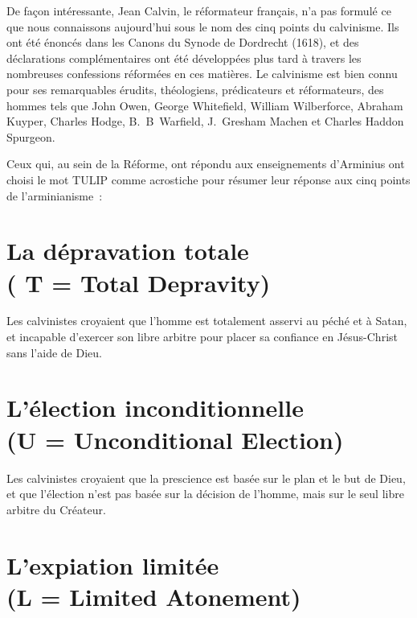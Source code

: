 
\digestpagebreak
\begin{pocketpar}{}
\begin{digestpar}{}
De façon intéressante, Jean Calvin, le réformateur français, n'a pas formulé
 ce que nous con\-naissons au\-jour\-d'hui sous le nom des cinq points du calvinisme.
 Ils ont été énoncés dans les Canons du Synode de Dordrecht (1618), et des déclarations
 complémentaires ont été développées plus tard à travers les nombreuses
 confessions réformées en ces matières. Le calvinisme est bien connu
 pour 
 ses remarquables érudits, théologiens, prédicateurs et réformateurs,
 des hommes tels que John Owen, George Whitefield,
 William Wilberforce, Abraham Kuyper, Charles Hodge,
 B.~B~Warfield, J.~Gresham Machen et
 Charles Haddon Spurgeon.
\end{digestpar}
\end{pocketpar}

Ceux qui, au sein de la Réforme, ont répondu aux enseignements d'Arminius
 ont choisi le mot \og \mbox{TULIP} \fg{} comme acrostiche pour résumer
 leur réponse aux cinq points de l'arminianisme~:


\newcommand*{\sectitle}[1]{%
   \normalsize(#1)}
\newcommand*{\secwithtitle}[2]{%
   \section*{#1\\\sectitle{#2}}}

\secwithtitle{La dépravation totale}{ T = Total Depravity}

Les calvinistes croyaient que l'hom\-me est totalement 
 asservi au péché  et à Satan,
 et incapable d'exercer son libre arbitre 
 pour placer sa confiance en Jésus-Christ sans l'aide de Dieu.

\secwithtitle{L'élection inconditionnelle}{U = Unconditional Election}

Les calvinistes croyaient que la prescience
 est basée sur le plan et le but de Dieu, et que l'élection
 n'est pas basée sur la décision de l'hom\-me, mais sur le seul \og libre arbitre \fg{}
 du Créateur.

\secwithtitle{L'expiation limitée}{L = Limited Atonement}

